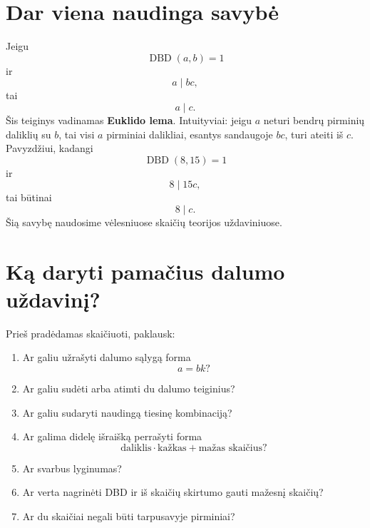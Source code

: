 \documentclass[11pt,a4paper]{scrartcl}
\begin{document}
\section{Dar viena naudinga savybė}

Jeigu
\[
\operatorname{DBD}(a,b)=1
\]
ir
\[
a\mid bc,
\]
tai
\[
a\mid c.
\]
Šis teiginys vadinamas \textbf{Euklido lema}. Intuityviai: jeigu $a$ neturi bendrų pirminių daliklių su $b$, tai visi
$a$ pirminiai dalikliai, esantys sandaugoje $bc$, turi ateiti iš $c$. Pavyzdžiui, kadangi
\[
\operatorname{DBD}(8,15)=1
\]
ir
\[
8\mid 15c,
\]
tai būtinai
\[
8\mid c.
\]
Šią savybę naudosime vėlesniuose skaičių teorijos uždaviniuose.

\section{Ką daryti pamačius dalumo uždavinį?}

Prieš pradėdamas skaičiuoti, paklausk:

\begin{enumerate}
    \renewcommand{\labelenumi}{\textbf{\theenumi.}}

    \item Ar galiu užrašyti dalumo sąlygą forma
    \[
    a=bk?
    \]

    \item Ar galiu sudėti arba atimti du dalumo teiginius?

    \item Ar galiu sudaryti naudingą tiesinę kombinaciją?

    \item Ar galima didelę išraišką perrašyti forma
    \[
    \text{daliklis}\cdot\text{kažkas}+\text{mažas skaičius}?
    \]

    \item Ar svarbus lyginumas?

    \item Ar verta nagrinėti DBD ir iš skaičių skirtumo gauti mažesnį skaičių?

    \item Ar du skaičiai negali būti tarpusavyje pirminiai?
\end{enumerate}

\newpage
\end{document}
